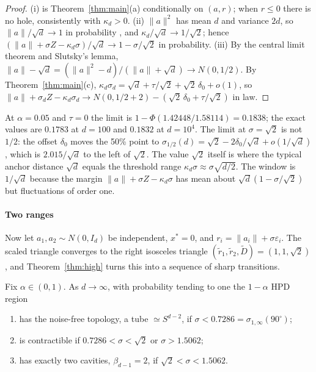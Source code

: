 \begin{proof}
(i) is Theorem~\ref{thm:main}(a) conditionally on $(a, r)$; when $r \le 0$ there is no hole, consistently with
$\kappa_d > 0$. (ii) $\|a\|^2$ has mean $d$ and variance $2d$, so $\|a\|/\sqrt d \to 1$ in probability \citep[\S3.1]{vershynin2018}, and
$\kappa_d/\sqrt d \to 1/\sqrt2$; hence $(\|a\| + \sigma Z - \kappa_d\sigma)/\sqrt d \to 1 - \sigma/\sqrt2$ in probability.
(iii) By the central limit theorem and Slutsky's lemma, $\|a\| - \sqrt d = (\|a\|^2 - d)/(\|a\| + \sqrt d) \to N(0, 1/2)$.
By Theorem~\ref{thm:main}(c), $\kappa_d\sigma_d = \sqrt d + \tau/\sqrt2 + \sqrt2\,\delta_0 + o(1)$, so
$\|a\| + \sigma_dZ - \kappa_d\sigma_d \to N(0, 1/2 + 2) - (\sqrt2\,\delta_0 + \tau/\sqrt2)$ in law.
\end{proof}

At $\alpha = 0.05$ and $\tau = 0$ the limit is $1 - \Phi(1.42448/1.58114) = 0.1838$; the exact values are $0.1783$ at
$d = 100$ and $0.1832$ at $d = 10^4$. The limit at $\sigma = \sqrt2$ is not $1/2$: the offset $\delta_0$ moves the 50\%
point to $\sigma_{1/2}(d) = \sqrt2 - 2\delta_0/\sqrt d + o(1/\sqrt d)$, which is $2.015/\sqrt d$ to the left of $\sqrt2$.
The value $\sqrt2$ itself is where the typical anchor distance $\sqrt d$ equals the threshold range
$\kappa_d\sigma \approx \sigma\sqrt{d/2}$. The window is $1/\sqrt d$ because the margin
$\|a\| + \sigma Z - \kappa_d\sigma$ has mean about $\sqrt d(1 - \sigma/\sqrt2)$ but fluctuations of order one.


\paragraph{Two ranges} Now let $a_1, a_2 \sim N(0, I_d)$ be independent, $x^* = 0$, and $r_i = \|a_i\| + \sigma\varepsilon_i$.
The scaled triangle converges to the right isosceles triangle $(\tilde r_1, \tilde r_2, \tilde D) = (1, 1, \sqrt2)$, and
Theorem~\ref{thm:high} turns this into a sequence of sharp transitions.

\begin{theorem}\label{thm:random2}
Fix $\alpha \in (0,1)$. As $d \to \infty$, with probability tending to one the $1-\alpha$ HPD region
\begin{enumerate}[label=(\roman*)]
\item has the noise-free topology, a tube $\simeq S^{d-2}$, if $\sigma < 0.7286 = \sigma_{1,\infty}(90^\circ)$;
\item is contractible if $0.7286 < \sigma < \sqrt2$ or $\sigma > 1.5062$;
\item has exactly two cavities, $\beta_{d-1} = 2$, if $\sqrt2 < \sigma < 1.5062$.
\end{enumerate}
\end{theorem}

